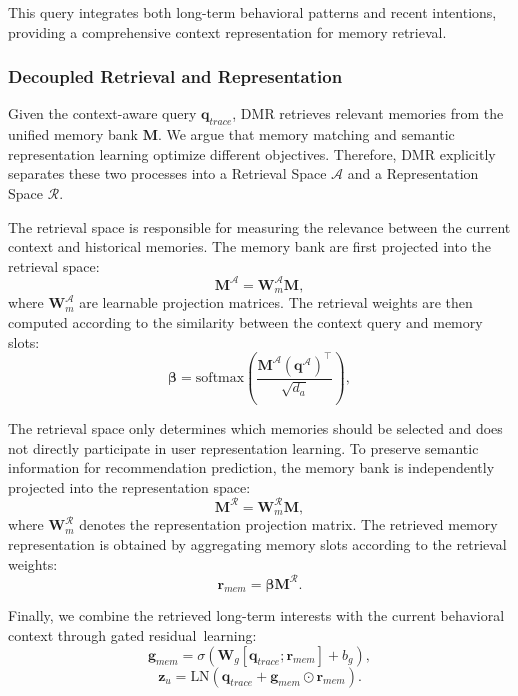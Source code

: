 \documentclass[letterpaper]{article} %
\theoremstyle{definition} %
\begin{document}
This query integrates both long-term behavioral patterns and recent intentions, providing a comprehensive context representation for memory retrieval.


\subsubsection{Decoupled Retrieval and Representation}

Given the context-aware query $\bm{q}_{trace}$, DMR retrieves relevant memories from the unified memory bank $\bm{M}$. 
We argue that memory matching and semantic representation learning optimize different objectives. 
Therefore, DMR explicitly separates these two processes into a Retrieval Space $\mathcal{A}$ and a Representation Space $\mathcal{R}$.

The retrieval space is responsible for measuring the relevance between the current context and historical memories.
The memory bank are first projected into the retrieval space:
\begin{equation}
\bm{M}^{\mathcal{A}}
=
\bm{W}_{m}^{\mathcal{A}}
\bm{M},
\end{equation}
where $\bm{W}_{m}^{\mathcal{A}}$ are learnable projection matrices. 
The retrieval weights are then computed according to the similarity between the context query and memory slots:
\begin{equation}
\boldsymbol{\beta}
=
\text{softmax}
\left(
\frac{
\bm{M}^{\mathcal{A}}
(\bm{q}^{\mathcal{A}})^{\top}
}
{\sqrt{d_a}}
\right),
\end{equation}

The retrieval space only determines which memories should be selected and does not directly participate in user representation learning. 
To preserve semantic information for recommendation prediction, the memory bank is independently projected into the representation space:
\begin{equation}
\bm{M}^{\mathcal{R}}
=
\bm{W}_{m}^{\mathcal{R}}
\bm{M},
\end{equation}
where $\bm{W}_{m}^{\mathcal{R}}$ denotes the representation projection matrix. The retrieved memory representation is obtained by aggregating memory slots according to the retrieval weights:
\begin{equation}
\bm{r}_{mem}
=
\boldsymbol{\beta}
\bm{M}^{\mathcal{R}}.
\end{equation}

Finally, we combine the retrieved long-term interests with the current behavioral context through gated residual~learning:
\begin{equation}
\bm{g}_{mem}
=
\sigma
(
\bm{W}_{g}
[\bm{q}_{trace};\bm{r}_{mem}]
+b_g
),
\end{equation}
\begin{equation}
\bm{z}_{u}
=
\text{LN}
(
\bm{q}_{trace}
+
\bm{g}_{mem}\odot\bm{r}_{mem}
).
\end{equation}
\end{document}
